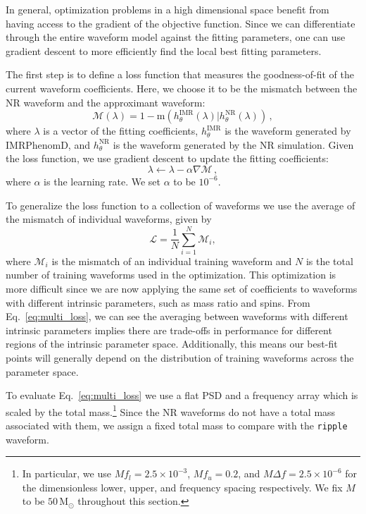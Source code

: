 \documentclass[twocolumn]{aastex631}
\newcommand{\ripple}{\texttt{ripple}\xspace}
\begin{document}
In general, optimization problems in a high dimensional space benefit from having access to the gradient of the objective function. 
Since we can differentiate through the entire waveform model against the fitting parameters, one can use gradient descent to more efficiently find the local best fitting parameters.

The first step is to define a loss function that measures the goodness-of-fit of the current waveform coefficients.
Here, we choose it to be the mismatch between the NR waveform and the approximant waveform:
\begin{equation}
    \label{eq:mismatch}
	\mathcal{M}(\lambda)=1-\mathrm{m}(h_{\theta}^{\mathrm{IMR}}(\lambda)|h_{\theta}^{\mathrm{NR}}(\lambda))\,,
\end{equation}
where $\lambda$ is a vector of the fitting coefficients, $h_{\theta}^{\mathrm{IMR}}$ is
the waveform generated by IMRPhenomD, and $h_{\theta}^{\mathrm{NR}}$ is the waveform
generated by the NR simulation. 
Given the loss function, we use gradient descent to update the fitting
coefficients:
\begin{equation}
	\lambda\leftarrow\lambda-\alpha\nabla\mathcal{M}\,, 
\end{equation}
where $\alpha$ is the learning rate. We set $\alpha$ to be $10^{-6}$. 

To generalize the loss function to a collection of waveforms we use the average of the mismatch of individual waveforms, given by
\begin{equation}
	\mathcal{L}=\frac{1}{N}\sum_{i=1}^{N}\mathcal{M}_i,
    \label{eq:multi_loss}
\end{equation}
where $\mathcal{M}_i$ is the mismatch of an individual training waveform and $N$ is the total number of training waveforms used in the optimization.
This optimization is more difficult since we are now applying the same set of coefficients to waveforms with different intrinsic parameters, such as mass ratio and spins. 
From Eq.~\eqref{eq:multi_loss}, we can see the averaging between waveforms with different intrinsic parameters implies there are trade-offs in performance for different regions of the intrinsic parameter space. 
Additionally, this means our best-fit points will generally depend on the distribution of training waveforms across the parameter space.

To evaluate Eq.~\eqref{eq:multi_loss} we use a flat PSD and a frequency array which is scaled by the total mass.\footnote{
    In particular, we use $M f_l = 2.5 \times 10^{-3}$, $M f_u = 0.2$, and $M\Delta f = 2.5 \times 10^{-6}$ for the dimensionless lower, upper, and frequency spacing respectively. We fix $M$ to be $50\,\mathrm{M}_\odot$ throughout this section.
}
Since the NR waveforms do not have a total mass associated with them, we assign a fixed total mass to compare with the \ripple waveform.
\end{document}
